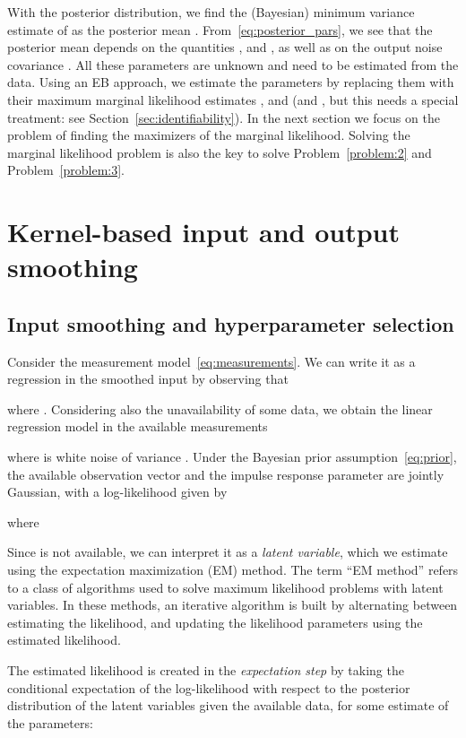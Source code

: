 \documentclass[10pt]{article}
\begin{document}
With the posterior distribution, we find the (Bayesian) minimum variance
estimate of  as the posterior mean .
From~\eqref{eq:posterior_pars}, we see that the posterior mean depends on the quantities
,  and , as well as on the output noise covariance
. All these parameters are unknown and need to be estimated from the data. Using an
EB approach, we estimate the parameters by replacing them with their maximum
marginal likelihood
estimates ,  and  (and , but
this needs a special treatment: see Section~\ref{sec:identifiability}). In the
next section we focus on the problem of finding the maximizers
of the marginal likelihood. Solving the marginal likelihood problem is also the key to solve
Problem~\ref{problem:2} and Problem~\ref{problem:3}.

\section{Kernel-based input and output smoothing}\label{sec:ml}
\subsection*{Input smoothing and hyperparameter selection}
Consider the measurement model~\eqref{eq:measurements}. We can write it as a
regression in the smoothed input  by observing that

where . Considering also the unavailability of some
data, we obtain the linear regression model in the available measurements

where  is white noise of variance .
Under the Bayesian prior assumption~\eqref{eq:prior}, the available observation
vector and the impulse response parameter are jointly Gaussian, with a
log-likelihood given by

where

Since  is not available, we can interpret it as a \emph{latent variable},
which we estimate using the expectation maximization (EM) method.  The term
``EM method'' refers to a class of algorithms used to solve maximum likelihood
problems with latent variables.  In these methods, an iterative algorithm is
built by alternating between estimating the likelihood, and
updating the likelihood parameters using the estimated likelihood.

The estimated likelihood is created in the \emph{expectation step} by taking the conditional
expectation of the log-likelihood with respect to the posterior distribution of
the latent variables given the available data, for some estimate of the parameters:
\end{document}
